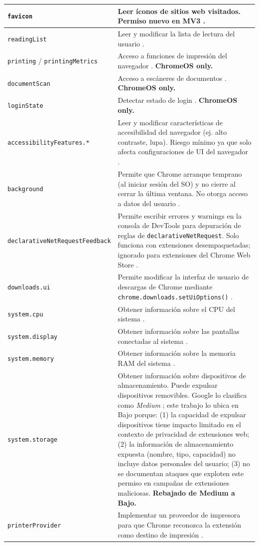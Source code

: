 \documentclass[12pt,oneside]{report}
\begin{document}
{\begin{longtable}{|p{4.5cm}|p{11cm}|}
\hline
\texttt{favicon} & Leer íconos de sitios web visitados. Permiso nuevo en MV3 \cite{chrome_permissions_list}. \\
\hline
\texttt{readingList} & Leer y modificar la lista de lectura del usuario \cite{chrome_permissions_list}. \\
\hline
\texttt{printing} / \texttt{printingMetrics} & Acceso a funciones de impresión del navegador \cite{chrome_permissions_list}. \textbf{ChromeOS only.} \\
\hline
\texttt{documentScan} & Acceso a escáneres de documentos \cite{chrome_permissions_list}. \textbf{ChromeOS only.} \\
\hline
\texttt{loginState} & Detectar estado de login \cite{chrome_permissions_list}. \textbf{ChromeOS only.} \\
\hline
\texttt{accessibilityFeatures.*} & Leer y modificar características de accesibilidad del navegador (ej. alto contraste, lupa). Riesgo mínimo ya que solo afecta configuraciones de UI del navegador \cite{chrome_permissions_list}. \\
\hline
\texttt{background} & Permite que Chrome arranque temprano (al iniciar sesión del SO) y no cierre al cerrar la última ventana. No otorga acceso a datos del usuario \cite{chrome_permissions_list}. \\
\hline
\texttt{declarativeNetRequest\-Feedback} & Permite escribir errores y warnings en la consola de DevTools para depuración de reglas de \texttt{declarativeNetRequest}. Solo funciona con extensiones desempaquetadas; ignorado para extensiones del Chrome Web Store \cite{chrome_permissions_list}. \\
\hline
\texttt{downloads.ui} & Permite modificar la interfaz de usuario de descargas de Chrome mediante \texttt{chrome.downloads.setUiOptions()} \cite{chrome_permissions_list}. \\
\hline
\texttt{system.cpu} & Obtener información sobre el CPU del sistema \cite{chrome_permissions_list}. \\
\hline
\texttt{system.display} & Obtener información sobre las pantallas conectadas al sistema \cite{chrome_permissions_list}. \\
\hline
\texttt{system.memory} & Obtener información sobre la memoria RAM del sistema \cite{chrome_permissions_list}. \\
\hline
\texttt{system.storage} & Obtener información sobre dispositivos de almacenamiento. Puede expulsar dispositivos removibles. Google lo clasifica como \textit{Medium} \cite{google_permission_risk}; este trabajo lo ubica en Bajo porque: (1) la capacidad de expulsar dispositivos tiene impacto limitado en el contexto de privacidad de extensiones web; (2) la información de almacenamiento expuesta (nombre, tipo, capacidad) no incluye datos personales del usuario; (3) no se documentan ataques que exploten este permiso en campañas de extensiones maliciosas. \textbf{Rebajado de Medium a Bajo.} \\
\hline
\texttt{printerProvider} & Implementar un proveedor de impresora para que Chrome reconozca la extensión como destino de impresión \cite{chrome_permissions_list}. \\
\hline
\end{longtable}
}
\end{document}
